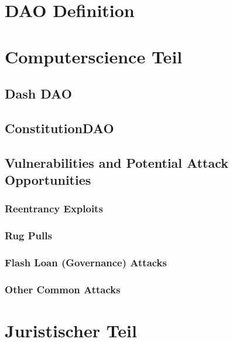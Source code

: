 \documentclass{article}
\author{Miro \textsc{Schüpbach} 17-109-851 \\
	Marcel \textsc{Zauder} 16-124-836}
\begin{document}
	\section{DAO Definition}
	\startsection
	\closesection
	
	\section{Computerscience Teil}
	\startsection
		\subsection{Dash DAO}
		\startsubsection
		\closesection
		\subsection{ConstitutionDAO}
		\startsubsection
		\closesection
		\subsection{Vulnerabilities and Potential Attack Opportunities}
		\startsubsection
			\subsubsection{Reentrancy Exploits}
			\startsubsection
			\closesection
			\subsubsection{Rug Pulls}
			\startsubsection
			\closesection
			\subsubsection{Flash Loan (Governance) Attacks}
			\startsubsection
			\closesection
			\subsubsection{Other Common Attacks}
			\startsubsection
			\closesection
		\closesection
	\closesection
	
	\section{Juristischer Teil}
	\startsection
	\closesection
\end{document}
